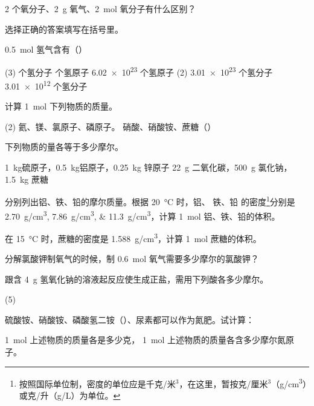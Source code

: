 \begin{Practice}[习题]
  \begin{question}
    \item 2 个氧分子、\qty{2}{g} 氧气、\qty{2}{mol} 氧分子有什么区别？
    \item 选择正确的答案填写在括号里。
    
    \noindent\qty{0.5}{mol} 氢气含有（\hspace{2em}）
    \begin{tasks}[label=\Alph*.](3)
       个氢分子
       个氢原子
      \task \num{6.02e23} 个氢原子
      \task*(2) \num{3.01e23} 个氢分子
      \task \num{3.01e12} 个氢分子
    \end{tasks}
    \item 计算 \qty{1}{mol} 下列物质的质量。
    \begin{tasks}(2)
      \task 氦、镁、氯原子、磷原子。
      \task 硝酸、硝酸铵、蔗糖（）
    \end{tasks}
    \item 下列物质的量各等于多少摩尔。
    \begin{tasks}
      \task \qty{1}{kg}硫原子，\qty{0.5}{kg}铝原子，\qty{0.25}{kg} 锌原子
      \task \qty{22}{g} 二氧化碳，\qty{500}{g} 氯化钠，\qty{1.5}{kg} 蔗糖
    \end{tasks}
    \item 分别列出铝、铁、铅的摩尔质量。根据 \qty{20}{\celsius} 时，铝、 铁、铅 的密度\footnote{按照国际单位制，密度的单位应是千克/米$^3$，在这里，暂按克/厘米$^3$（\unit{g/cm^3}）或克/升（\unit{g/L}）为单位。}分别是 \qtylist{2.70;7.86;11.3}{g/cm^3}，计算 \qty{1}{mol} 铝、铁、铅的体积。
    \item 在 \qty{15}{\celsius} 时，蔗糖的密度是 \qty{1.588}{g/cm^3}，计算 \qty{1}{mol} 蔗糖的体积。
    \item 分解氯酸钾制氧气的时候，制 \qty{0.6}{mol} 氧气需要多少摩尔的氯酸钾？
    \item 跟含 \qty{4}{g} 氢氧化钠的溶液起反应使生成正盐，需用下列酸各多少摩尔。
    \begin{tasks}(5)
      \task {}
      \task {}
      \task {}
      \task {}
      \task {}
    \end{tasks}
    \item 硫酸铵、硝酸铵、磷酸氢二铵（）、尿素都可以作为氮肥。试计算：
    \begin{tasks}
      \task \qty{1}{mol} 上述物质的质量各是多少克，
      \task \qty{1}{mol} 上述物质的质量各含多少摩尔氮原子。
    \end{tasks}
  \end{question}
\end{Practice}

